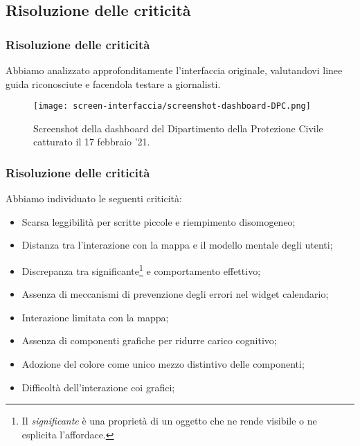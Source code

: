 \subsection{Risoluzione delle criticità}


\begin{frame}
    \frametitle{Risoluzione delle criticità}
    Abbiamo analizzato approfonditamente l'interfaccia originale, valutandovi linee guida riconosciute e facendola testare a giornalisti. 
    \begin{figure}
        \centering
        \texttt{[image: screen-interfaccia/screenshot-dashboard-DPC.png]}
        \caption{Screenshot della dashboard del Dipartimento della Protezione Civile catturato il 17 febbraio '21.}
    \end{figure}
\end{frame}

\begin{frame}
    \frametitle{Risoluzione delle criticità}
    Abbiamo individuato le seguenti criticità: 
    \begin{itemize}
        \item<1-> Scarsa leggibilità per scritte piccole e riempimento disomogeneo;
        \item<2-> Distanza tra l'interazione con la mappa e il modello mentale degli utenti;
        \item<3-> Discrepanza tra significante\footnote{Il \textit{significante} è una proprietà di un oggetto che ne rende visibile o ne esplicita l'affordace.} e comportamento effettivo;
        \item<4-> Assenza di meccanismi di prevenzione degli errori nel widget calendario;
        \item<5-> Interazione limitata con la mappa;
        \item<6-> Assenza di componenti grafiche per ridurre carico cognitivo;
        \item<7-> Adozione del colore come unico mezzo distintivo delle componenti;
        \item<8-> Difficoltà dell'interazione coi grafici;
    \end{itemize}    

\end{frame}

